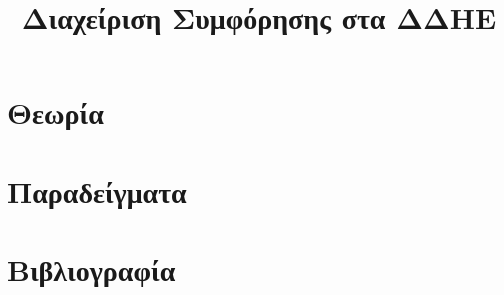 \title{Διαχείριση Συμφόρησης στα ΔΔΗΕ}

\section{Θεωρία}
\label{kef-06-theoria}

\section{Παραδείγματα}
\label{kef-06-paradeigmata}

\section{Βιβλιογραφία}
\label{kef-06-vivliografia}
